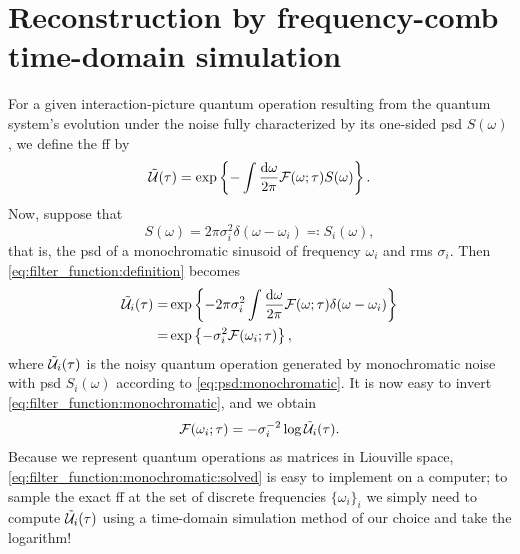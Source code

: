 \chapter{Reconstruction by frequency-comb time-domain simulation}\label{ch:filter_functions:validation}
For a {\color{RWTHmagenta75} given} interaction-picture quantum operation \liouvUe resulting from the quantum system's evolution under the noise fully characterized by its one-sided \gls{psd} $S(\omega)$, we define the \gls{ff} \FF by
\begin{align}
    \label{eq:filter_function:definition}
    \mathcal{\tilde{U}}(\tau) = \exp\left\{-\int\frac{\dd{\omega}}{2\pi}\mathcal{F}(\omega;\tau) S(\omega)\right\}.
\end{align}
Now, suppose that
\begin{equation}
    \label{eq:psd:monochromatic}
    S(\omega) = 2\pi\sigma_i^2 \delta(\omega - \omega_i) \eqqcolon S_i(\omega),
\end{equation}
that is, the \gls{psd} of a monochromatic sinusoid of frequency $\omega_i$ and \gls{rms} $\sigma_i$.
Then \cref{eq:filter_function:definition} becomes
\begin{equation}
    \label{eq:filter_function:monochromatic}
    \begin{split}
        \mathcal{\tilde{U}}_i(\tau) =& \exp\left\lbrace -2\pi\sigma_i^2\int\frac{\dd{\omega}}{2\pi}\mathcal{F}(\omega;\tau)\delta(\omega - \omega_i)\right\rbrace \\
                                  =& \exp\left\lbrace -\sigma_i^2\mathcal{F}(\omega_i;\tau)\right\rbrace,
    \end{split}
\end{equation}
where $\mathcal{\tilde{U}}_i(\tau)$ is the noisy quantum operation generated by monochromatic noise with \gls{psd} $S_i(\omega)$ according to \cref{eq:psd:monochromatic}.
It is now easy to invert \cref{eq:filter_function:monochromatic}, and we obtain
\begin{align}
    \label{eq:filter_function:monochromatic:solved}
    \mathcal{F}(\omega_i; \tau) = -\sigma_i^{-2}\log\mathcal{\tilde{U}}_i(\tau).
\end{align}
Because we represent quantum operations as matrices in Liouville space, \cref{eq:filter_function:monochromatic:solved} is easy to implement on a computer; to sample the exact \gls{ff} at the set of discrete frequencies $\lbrace\omega_i\rbrace_i$ we simply need to compute $\mathcal{\tilde{U}}_i(\tau)$  using a time-domain simulation method of our choice and take the logarithm!

